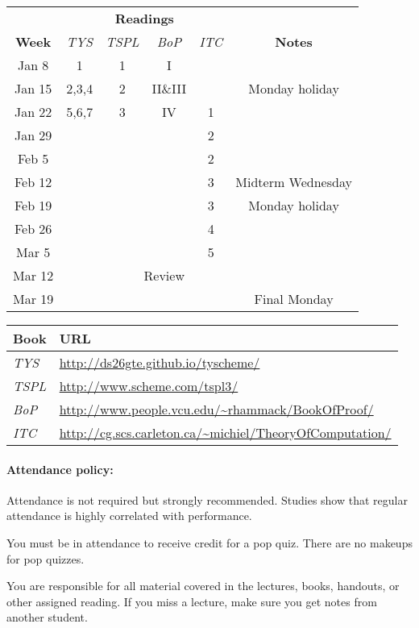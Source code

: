 \documentclass{article}
\begin{document}
  \begin{center}
\begin{tabular}{c|cccc|c}                      
 & \multicolumn{4}{c|}{\bf Readings} &  \\
{\bf Week} &\em TYS & \em TSPL &\em BoP&\em ITC & {\bf Notes} \\\hline  
Jan 8  & 1 & 1 & I   &   \\
Jan 15 & 2,3,4 & 2 & II\&III  & &  Monday holiday \\          
Jan 22 & 5,6,7 & 3 & IV  & 1 \\
Jan 29 &  &   &     & 2 \\
Feb 5  &  &   &     & 2 \\
Feb 12 &  &   &     & 3 & Midterm Wednesday \\
Feb 19 &  &   &     & 3 & Monday holiday\\
Feb 26 &  &   &     & 4\\
Mar 5  &  &   &     & 5 \\
Mar 12 &  & \multicolumn{3}{c|}{Review} & \\                 
Mar 19 &  &   &     &   & Final Monday  \\
\end{tabular}

\begin{tabular}{ll}
Book & URL\\\hline
{\em TYS} &       \url{http://ds26gte.github.io/tyscheme/} \\
{\em TSPL} & \url{http://www.scheme.com/tspl3/} \\
{\em BoP} & \url{http://www.people.vcu.edu/~rhammack/BookOfProof/}\\
{\em ITC} & \url{http://cg.scs.carleton.ca/~michiel/TheoryOfComputation/}\\
\end{tabular}

\end{center}

\paragraph{Attendance policy:} Attendance is not required but strongly
  recommended.  Studies show that regular attendance is highly
  correlated with performance.

  You must be in attendance to receive credit for a pop quiz.  There
  are no makeups for pop quizzes.

  You are responsible for all material covered in the lectures, books,
  handouts, or other assigned reading.  If you miss a lecture,
  make sure you get notes from another student.
\end{document}
